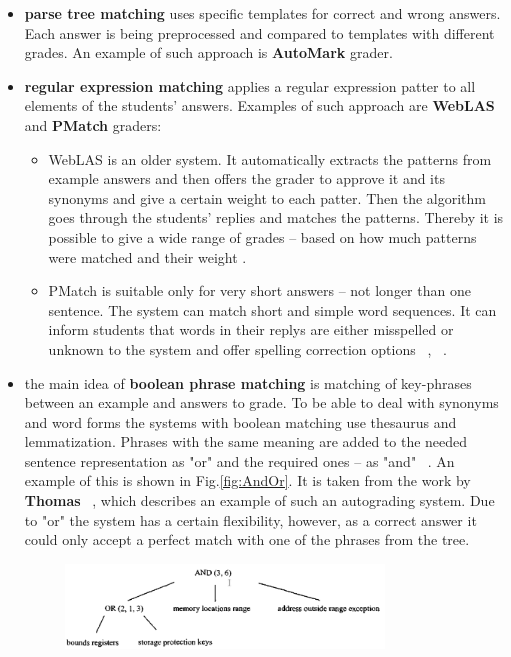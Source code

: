 \begin{itemize}
\item \textbf{parse tree matching} uses specific templates for correct and wrong answers. Each answer is being preprocessed and compared to templates with different grades. An example of such approach is \textbf{AutoMark} grader.
\item \textbf{regular expression matching} applies a regular expression patter to all elements of the students' answers. Examples of such approach are \textbf{WebLAS} and \textbf{PMatch} graders:
\begin{itemize}
\item  WebLAS is an older system. It automatically extracts the patterns from example answers and then offers the grader to approve it and its synonyms and give a certain weight to each patter. Then the algorithm goes through the students' replies and matches the patterns. Thereby it is possible to give a wide range of grades -- based on how much patterns were matched and their weight \cite{Burrows}. 
\item PMatch is suitable only for very short answers -- not longer than one sentence. The system can match short and simple word sequences. It can inform students that words in their replys are either misspelled or unknown to the system and offer spelling correction options ~\cite{Hasanah}, ~\cite{Burrows}.
\end{itemize}
\item the main idea of \textbf{boolean phrase matching} is matching of key-phrases between an example and answers to grade. To be able to deal with synonyms and word forms the systems with boolean matching use thesaurus and lemmatization. Phrases with the same meaning are added to the needed sentence representation as "or" and the required ones -- as "and" ~\cite{Hasanah}. An example of this is shown in Fig.\ref{fig:AndOr}. It is taken from the work by \textbf{Thomas} ~\cite{Thomas}, which describes an example of such an autograding system. Due to "or" the system has a certain flexibility, however, as a correct answer it could only accept a perfect match with one of the phrases from the tree.
\begin{figure}[h!]
  \centering
  \includegraphics[width=0.8\textwidth]{img/AndOr}

\end{figure}
\end{itemize}

